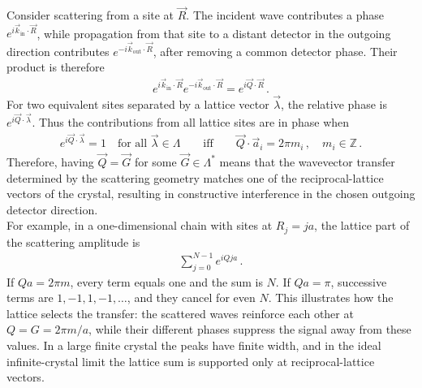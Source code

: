 \documentclass[11pt, oneside]{book}
\theoremstyle{break}
\theoremstyle{break}
\newcommand{\Z}{\mathbb{Z}}
\begin{document}
Consider scattering from a site at $\vec{R}$. The incident wave contributes a phase $e^{i\vec{k}_{\text{in}}\cdot\vec{R}}$, while propagation from that site to a distant detector in the outgoing direction contributes $e^{-i\vec{k}_{\text{out}}\cdot\vec{R}}$, after removing a common detector phase. Their product is therefore
\begin{align*}
e^{i\vec{k}_{\text{in}}\cdot\vec{R}}
e^{-i\vec{k}_{\text{out}}\cdot\vec{R}}
=e^{i\vec{Q}\cdot\vec{R}}\,.
\end{align*}
For two equivalent sites separated by a lattice vector $\vec{\lambda}$, the relative phase is $e^{i\vec{Q}\cdot\vec{\lambda}}$. Thus the contributions from all lattice sites are in phase when
\begin{align*}
e^{i\vec{Q}\cdot\vec{\lambda}}=1
\quad\text{for all }\vec{\lambda}\in\Lambda
\qquad\text{iff}\qquad
\vec{Q}\cdot\vec{a}_i=2\pi m_i\,,\quad m_i\in\Z\,.
\end{align*}
Therefore, having $\vec{Q}=\vec{G}$ for some $\vec{G}\in \Lambda^*$ means that the wavevector transfer determined by the scattering geometry matches one of the reciprocal-lattice vectors of the crystal, resulting in constructive interference in the chosen outgoing detector direction.\\

For example, in a one-dimensional chain with sites at $R_j=ja$, the lattice part of the scattering amplitude is
\begin{align*}
\sum_{j=0}^{N-1}e^{iQja}\,.
\end{align*}
If $Qa=2\pi m$, every term equals one and the sum is $N$. If $Qa=\pi$, successive terms are $1,-1,1,-1,\ldots$, and they cancel for even $N$. This illustrates how the lattice selects the transfer: the scattered waves reinforce each other at $Q=G=2\pi m/a$, while their different phases suppress the signal away from these values. In a large finite crystal the peaks have finite width, and in the ideal infinite-crystal limit the lattice sum is supported only at reciprocal-lattice vectors. \\
\end{document}

